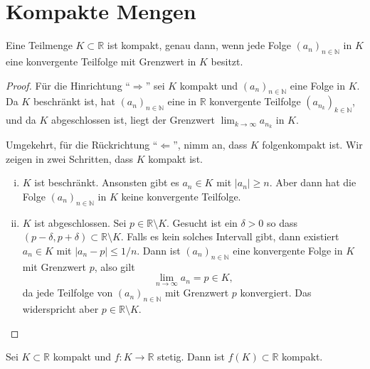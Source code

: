 \documentclass[../main.tex]{subfiles}
\begin{document}
\section{Kompakte Mengen}
\begin{proposition}[Folgenkompaktheit]
  Eine Teilmenge $K \subset \mathbb{R}$ ist
  kompakt, genau dann, wenn jede Folge
  ${(a_{n})}_{n \in \mathbb{N}}$ in $K$
  eine konvergente Teilfolge mit Grenzwert
  in $K$ besitzt.
\end{proposition}

\begin{proof}
  Für die Hinrichtung ``$\Rightarrow$''
  sei $K$ kompakt und ${(a_{n})}_{n \in \mathbb{N}}$
  eine Folge
  in $K$.
  Da $K$ beschränkt ist, hat ${(a_{n})}_{n \in \mathbb{N}}$ 
  eine in $\mathbb{R}$ konvergente
  Teilfolge  ${(a_{n_{k}})}_{k \in \mathbb{N}}$, und
  da $K$ abgeschlossen ist, liegt
  der Grenzwert $\lim_{k \to \infty} a_{n_k}$ in $K$.

  Umgekehrt, für die Rückrichtung ``$\Leftarrow$'',
  nimm an, dass $K$ folgenkompakt ist. %
  Wir zeigen in zwei Schritten, dass
  $K$ kompakt ist.
  \begin{enumerate}[(i)]
    \item $K$ ist beschränkt.
      Ansonsten gibt es $a_n \in K$
      mit $|a_{n}| \geq n$.
      Aber dann hat die Folge
      ${(a_{n})}_{n \in \mathbb{N}}$ 
      in $K$ keine konvergente Teilfolge.
    \item $K$ ist abgeschlossen.
      Sei $p \in \mathbb{R} \setminus K$.
      Gesucht ist ein $\delta > 0$ 
      so dass
      $(p - \delta, p + \delta) \subset \mathbb{R} \setminus K$.
      Falls es kein solches Intervall gibt,
      dann existiert $a_n \in K$ mit
      $|a_n - p| \leq 1/n$.
      Dann ist ${(a_{n})}_{n \in \mathbb{N}}$ eine
      konvergente Folge in $K$ mit Grenzwert $p$, also gilt
      \[
        \lim_{n \to \infty} a_n = p \in K,
      \]
      da jede Teilfolge von ${(a_{n})}_{n \in \mathbb{N}}$ 
      mit Grenzwert $p$ konvergiert. Das widerspricht
      aber $p \in \mathbb{R} \setminus K$. \qedhere
  \end{enumerate}
\end{proof}

\begin{proposition}\label{prop:image-compact-compact}
  Sei $K \subset \mathbb{R}$ kompakt und
  $f \colon K \to \mathbb{R}$ stetig.
  Dann ist $f(K) \subset \mathbb{R}$ kompakt.
\end{proposition}
\end{document}
